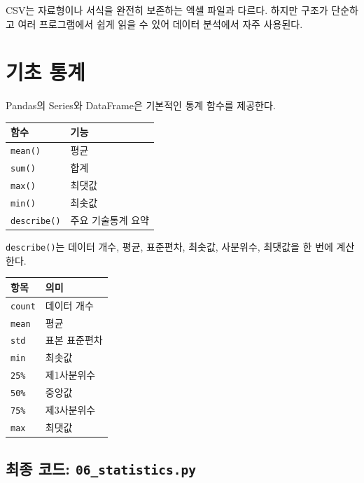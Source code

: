 \documentclass[11pt,a4paper]{article}
\begin{document}
\begin{importantbox}
CSV는 자료형이나 서식을 완전히 보존하는 엑셀 파일과 다르다. 하지만 구조가 단순하고 여러 프로그램에서 쉽게 읽을 수 있어 데이터 분석에서 자주 사용된다.
\end{importantbox}

\section{기초 통계}

Pandas의 Series와 DataFrame은 기본적인 통계 함수를 제공한다.

\begin{center}
\begin{tabular}{ll}
\toprule
함수 & 기능 \\
\midrule
\texttt{mean()} & 평균 \\
\texttt{sum()} & 합계 \\
\texttt{max()} & 최댓값 \\
\texttt{min()} & 최솟값 \\
\texttt{describe()} & 주요 기술통계 요약 \\
\bottomrule
\end{tabular}
\end{center}

\texttt{describe()}는 데이터 개수, 평균, 표준편차, 최솟값, 사분위수, 최댓값을 한 번에 계산한다.

\begin{center}
\begin{tabular}{ll}
\toprule
항목 & 의미 \\
\midrule
\texttt{count} & 데이터 개수 \\
\texttt{mean} & 평균 \\
\texttt{std} & 표본 표준편차 \\
\texttt{min} & 최솟값 \\
\texttt{25\%} & 제1사분위수 \\
\texttt{50\%} & 중앙값 \\
\texttt{75\%} & 제3사분위수 \\
\texttt{max} & 최댓값 \\
\bottomrule
\end{tabular}
\end{center}

\subsection{최종 코드: \texttt{06\_statistics.py}}
\end{document}
